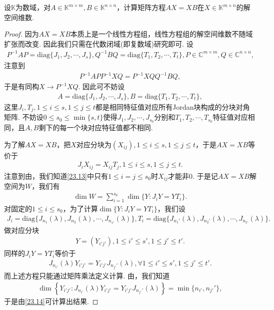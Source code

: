 \documentclass[../../main.tex]{subfiles}
\begin{document}
\begin{theorem}\label{theorem:AX-XB相关命题3}
设$\mathbb{K}$为数域，对$A\in\mathbb{K}^{m\times m}, B\in\mathbb{K}^{n\times n}$，计算矩阵方程$AX = XB$在$X\in\mathbb{K}^{m\times n}$的解空间维数.
\end{theorem}
\begin{proof}
因为$AX = XB$本质上是一个线性方程组，线性方程组的解空间维数不随域扩张而改变. 因此我们只需在代数闭域(即复数域)研究即可. 设
\begin{align*}
P^{-1}AP = \mathrm{diag}\{J_1, J_2, \cdots, J_s\}, Q^{-1}BQ = \mathrm{diag}\{T_1, T_2, \cdots, T_t\}, P\in\mathbb{C}^{m\times m}, Q\in\mathbb{C}^{n\times n},
\end{align*}
注意到
\begin{align*}
P^{-1}APP^{-1}XQ = P^{-1}XQQ^{-1}BQ,
\end{align*}
于是有同构$X\to P^{-1}XQ$. 因此可不妨设
\begin{align*}
A = \mathrm{diag}\{J_1, J_2, \cdots, J_s\}, B = \mathrm{diag}\{T_1, T_2, \cdots, T_t\},
\end{align*}
这里$J_i, T_j, 1\leqslant i\leqslant s, 1\leqslant j\leqslant t$都是相同特征值对应所有Jordan块构成的分块对角矩阵. 不妨设$0\leqslant s_0\leqslant\min\{s, t\}$使得$J_1, J_2, \cdots, J_{s_0}$分别和$T_1, T_2, \cdots, T_{s_0}$特征值对应相同，且$A, B$剩下的每一个块对应特征值都不相同.

为了解$AX = XB$，把$X$对应分块为$(X_{ij}), 1\leqslant i\leqslant s, 1\leqslant j\leqslant t$，于是$AX = XB$等价于
\begin{align}
J_iX_{ij} = X_{ij}T_j, 1\leqslant i\leqslant s, 1\leqslant j\leqslant t. \label{23.13}
\end{align}
注意到由，我们知道\eqref{23.13}中只有$1\leqslant i = j\leqslant s_0$时$X_{ij}$才能非$0$. 于是记$AX = XB$解空间为$W$，我们有
\begin{align}
\dim W = \sum_{i = 1}^{s_0}\dim\{Y : J_iY = YT_i\}. \label{23.14}
\end{align}
对固定的$1\leqslant i\leqslant s_0$，为了计算$\dim\{Y : J_iY = YT_i\}$，我们设
\begin{align*}
J_i = \mathrm{diag}\{J_{n_1}(\lambda), J_{n_2}(\lambda), \cdots, J_{n_{s'}}(\lambda)\}, T_i = \mathrm{diag}\{J_{n_1'}(\lambda), J_{n_2'}(\lambda), \cdots, J_{n_{t'}}(\lambda)\}.
\end{align*}
做对应分块
\begin{align*}
Y = (Y_{i'j'}), 1\leqslant i'\leqslant s', 1\leqslant j'\leqslant t'.
\end{align*}
同样的$J_iY = YT_i$等价于
\begin{align}
J_{n_{i'}}(\lambda)Y_{i'j'} = Y_{i'j'}J_{n_{j'}'}(\lambda), \forall 1\leqslant i'\leqslant s', 1\leqslant j'\leqslant t'. \label{23.15}
\end{align}
而上述方程只能通过矩阵乘法定义计算. 由，我们知道
\begin{align*}
\dim\left\{Y_{i'j'} : J_{n_{i'}}(\lambda)Y_{i'j'} = Y_{i'j'}J_{n_{j'}'}(\lambda)\right\} = \min\{n_{i'}, n_{j'}'\},
\end{align*}
于是由\eqref{23.14}可计算出结果. 


\end{proof}
\end{document}
